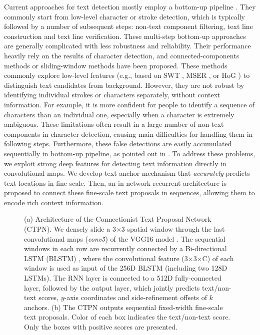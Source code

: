\documentclass[runningheads]{llncs}
\begin{document}
Current approaches for text detection mostly employ a bottom-up pipeline \cite{Tian2015,Busta2015,Huang2014,Yin2015,Yin2014}. They commonly start from  low-level character or stroke detection, which is typically followed by a number of subsequent steps: non-text component filtering, text line construction and text line verification.  These multi-step bottom-up approaches are generally complicated with less  robustness and reliability. Their performance heavily rely on the results of character detection, and connected-components methods or sliding-window methods have been proposed. These methods commonly explore low-level features (e.g., based on SWT \cite{Epshtein2010,Huang2013}, MSER \cite{Huang2014,Yin2014,Neumann2015}, or HoG \cite{Tian2015}) to distinguish text candidates from background. However, they are not robust by identifying individual strokes or characters separately, without context information. For example, it is more confident for people to identify a sequence of characters than an individual one, especially when a character is extremely ambiguous. These limitations often result in a large number of non-text components in character detection, causing  main difficulties for handling them in following steps. Furthermore, these false detections are easily accumulated sequentially in  bottom-up pipeline, as pointed out in \cite{Tian2015}. To address these problems, we exploit strong deep features for detecting text information  directly in  convolutional maps. We develop text anchor mechanism that \textit{accurately} predicts text locations in fine scale. Then, an in-network recurrent architecture is proposed to connect these fine-scale text proposals in sequences, allowing them to encode rich context information.

 \begin{figure}[tb]
\centering
{}
\caption{(a) Architecture of the Connectionist Text Proposal Network (CTPN). We densely slide a 3$\times$3 spatial window through the last convolutional maps (\textit{conv5}) of the VGG16 model \cite{Simonyan2015}. The sequential windows in each row are recurrently connected by a Bi-directional LSTM (BLSTM) \cite{Graves2005}, where the  convolutional feature (3$\times$3$\times$C) of each window is used as input of the 256D BLSTM (including two 128D LSTMs). The RNN layer is connected to a 512D fully-connected layer, followed by the output layer, which jointly predicts text/non-text scores, $y$-axis coordinates  and side-refinement offsets of $k$ anchors. (b) The CTPN outputs sequential fixed-width fine-scale text proposals.  Color of  each box indicates the text/non-text score. Only the boxes with positive scores are presented.}
\label{fig:main}
\end{figure}
\end{document}
